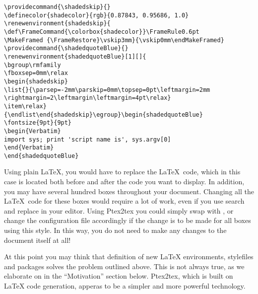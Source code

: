 \documentclass[a4paper,11pt]{article}
\begin{document}
\begin{verbatim}
\providecommand{\shadedskip}{}
\definecolor{shadecolor}{rgb}{0.87843, 0.95686, 1.0}
\renewenvironment{shadedskip}{
\def\FrameCommand{\colorbox{shadecolor}}\FrameRule0.6pt
\MakeFramed {\FrameRestore}\vskip3mm}{\vskip0mm\endMakeFramed}
\providecommand{\shadedquoteBlue}{}
\renewenvironment{shadedquoteBlue}[1][]{
\bgroup\rmfamily
\fboxsep=0mm\relax
\begin{shadedskip}
\list{}{\parsep=-2mm\parskip=0mm\topsep=0pt\leftmargin=2mm
\rightmargin=2\leftmargin\leftmargin=4pt\relax}
\item\relax}
{\endlist\end{shadedskip}\egroup}\begin{shadedquoteBlue}
\fontsize{9pt}{9pt}
\begin{Verbatim}
import sys; print 'script name is', sys.argv[0]
\end{Verbatim}
\end{shadedquoteBlue}
\end{verbatim}
\noindent
Using plain \LaTeX, you would have to replace the \LaTeX~code, which in this
case is located both before and after the code you want to display. In
addition, you may have several hundred boxes throughout your document. Changing
all the \LaTeX~code for these boxes would require a lot of work, even if you
use search and replace in your editor. Using Ptex2tex you could
simply swap  with , or change the configuration file
accordingly if the change is to be made for all boxes using this style.
In this way, you do not need to
make any changes to the document itself at all!

At this point you may think that definition of new
\LaTeX{} environments, stylefiles and packages solves the problem
outlined above. This is not always true, as we elaborate on in the
``Motivation'' section below. Ptex2tex, which is built on 
\LaTeX{} code generation, apperas to be a simpler
and more powerful technology.
\end{document}
